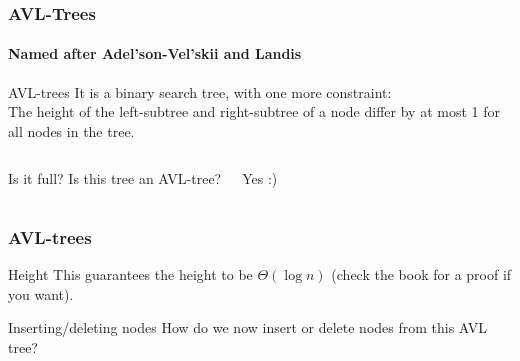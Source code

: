 \begin{frame}
	\frametitle{AVL-Trees}
	\framesubtitle{Named after Adel'son-Vel'skii and Landis}

		\begin{block}{AVL-trees}
			It is a binary search tree, with one more constraint:\\
			The height of the left-subtree and right-subtree of a node differ by at most 1 for all nodes in the tree.
		\end{block}	

	\begin{columns}


		\begin{questionblock}{Is it full?}
			Is this tree an AVL-tree?
		\end{questionblock}
		\pause
		\begin{answerblock}{}
			Yes :)	
		\end{answerblock}
	\end{columns}
\end{frame}

\begin{frame}
	\frametitle{AVL-trees}
	\begin{block}{Height}
		This guarantees the height to be $\Theta(\log n)$ (check the book for a proof if you want).
	\end{block}

	\pause
	\begin{problemblock}{Inserting/deleting nodes}
		How do we now insert or delete nodes from this AVL tree?
	\end{problemblock}
\end{frame}

